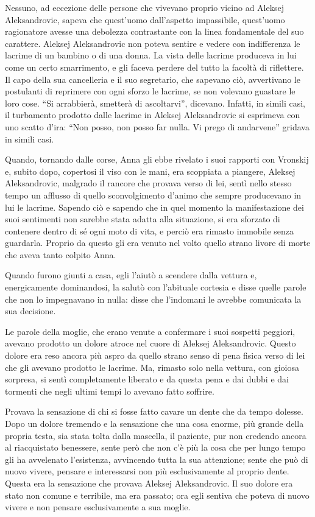 Nessuno, ad eccezione delle persone che vivevano proprio vicino ad Aleksej Aleksandrovic, sapeva che quest'uomo dall'aspetto impassibile, quest'uomo ragionatore avesse una debolezza contrastante con la linea fondamentale del suo carattere. Aleksej Aleksandrovic non poteva sentire e vedere con indifferenza le lacrime di un bambino o di una donna. La vista delle lacrime produceva in lui come un certo smarrimento, e gli faceva perdere del tutto la facoltà di riflettere. Il capo della sua cancelleria e il suo segretario, che sapevano ciò, avvertivano le postulanti di reprimere con ogni sforzo le lacrime, se non volevano guastare le loro cose. ``Si arrabbierà, smetterà di ascoltarvi'', dicevano. Infatti, in simili casi, il turbamento prodotto dalle lacrime in Aleksej Aleksandrovic si esprimeva con uno scatto d'ira: ``Non posso, non posso far nulla. Vi prego di andarvene'' gridava in simili casi. 

Quando, tornando dalle corse, Anna gli ebbe rivelato i suoi rapporti con Vronskij e, subito dopo, copertosi il viso con le mani, era scoppiata a piangere, Aleksej Aleksandrovic, malgrado il rancore che provava verso di lei, sentì nello stesso tempo un afflusso di quello sconvolgimento d'animo che sempre producevano in lui le lacrime. Sapendo ciò e sapendo che in quel momento la manifestazione dei suoi sentimenti non sarebbe stata adatta alla situazione, si era sforzato di contenere dentro di sé ogni moto di vita, e perciò era rimasto immobile senza guardarla. Proprio da questo gli era venuto nel volto quello strano livore di morte che aveva tanto colpito Anna. 

Quando furono giunti a casa, egli l'aiutò a scendere dalla vettura e, energicamente dominandosi, la salutò con l'abituale cortesia e disse quelle parole che non lo impegnavano in nulla: disse che l'indomani le avrebbe comunicata la sua decisione. 

Le parole della moglie, che erano venute a confermare i suoi sospetti peggiori, avevano prodotto un dolore atroce nel cuore di Aleksej Aleksandrovic. Questo dolore era reso ancora più aspro da quello strano senso di pena fisica verso di lei che gli avevano prodotto le lacrime. Ma, rimasto solo nella vettura, con gioiosa sorpresa, si sentì completamente liberato e da questa pena e dai dubbi e dai tormenti che negli ultimi tempi lo avevano fatto soffrire. 

Provava la sensazione di chi si fosse fatto cavare un dente che da tempo dolesse. Dopo un dolore tremendo e la sensazione che una cosa enorme, più grande della propria testa, sia stata tolta dalla mascella, il paziente, pur non credendo ancora al riacquistato benessere, sente però che non c'è più la cosa che per lungo tempo gli ha avvelenato l'esistenza, avvincendo tutta la sua attenzione; sente che può di nuovo vivere, pensare e interessarsi non più esclusivamente al proprio dente. Questa era la sensazione che provava Aleksej Aleksandrovic. Il suo dolore era stato non comune e terribile, ma era passato; ora egli sentiva che poteva di nuovo vivere e non pensare esclusivamente a sua moglie. 

